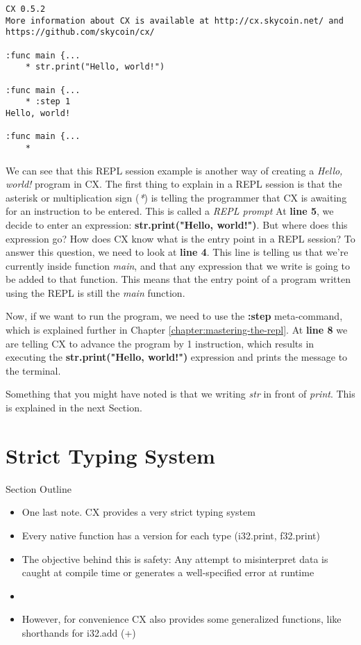 \documentclass[11pt,fleqn,openany]{book} %
\begin{document}
\begin{lstlisting}[caption={REPL Session Example},captionpos=b,label={listing:repl-example-1}]
CX 0.5.2
More information about CX is available at http://cx.skycoin.net/ and https://github.com/skycoin/cx/

:func main {...
	* str.print("Hello, world!")

:func main {...
	* :step 1
Hello, world!

:func main {...
	* 
\end{lstlisting}

We can see that this REPL session example is another way of creating a \textit{Hello, world!} program in CX. The first thing to explain in a REPL session is that the asterisk or multiplication sign (\textit{*}) is telling the programmer that CX is awaiting for an instruction to be entered. This is called a \textit{REPL prompt} At \textbf{line 5}, we decide to enter an expression: \textbf{str.print("Hello, world!")}. But where does this expression go? How does CX know what is the entry point in a REPL session? To answer this question, we need to look at \textbf{line 4}. This line is telling us that we're currently inside function \emph{main}, and that any expression that we write is going to be added to that function. This means that the entry point of a program written using the REPL is still the \textit{main} function.

Now, if we want to run the program, we need to use the \textbf{:step} meta-command, which is explained further in Chapter \ref{chapter:mastering-the-repl}. At \textbf{line 8} we are telling CX to advance the program by 1 instruction, which results in executing the \textbf{str.print("Hello, world!")} expression and prints the message to the terminal.

Something that you might have noted is that we writing \textit{str} in front of \textit{print}. This is explained in the next Section.

\section{Strict Typing System}

\begin{remark}
Section Outline
    \begin{itemize}
    	\item One last note. CX provides a very strict typing system
        \item Every native function has a version for each type (i32.print, f32.print)
        \item The objective behind this is safety: Any attempt to misinterpret data is caught at compile time or generates a well-specified error at runtime
        \item 
        \item However, for convenience CX also provides some generalized functions, like shorthands for i32.add (+)
    \end{itemize}
\end{remark}
\end{document}
